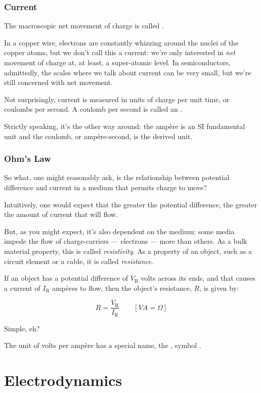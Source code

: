 \subsubsection{Current}

The macroscopic net movement of charge is called .

In a copper wire, electrons are constantly whizzing around the nuclei
of the copper atoms, but we don't call this a current: we're only
interested in \emph{net} movement of charge at, at least, a
super-atomic level. In semiconductors, admittedly, the scales where we
talk about current can be very small, but we're still concerned with
net movement.

Not surprisingly, current is measured in units of charge per unit
time, or coulombs per second. A coulomb per second is called an
.

Strictly speaking, it's the other way around: the amp\`ere is an SI
fundamental unit and the coulomb, or amp\`ere-second, is the derived
unit.

\subsubsection{Ohm's Law}

So what, one might reasonably ask, is the relationship between
potential difference and current in a medium that permits charge to
move?

Intuitively, one would expect that the greater the potential
difference, the greater the amount of current that will flow.

But, as you might expect, it's also dependent on the medium: some
media impede the flow of charge-carriers --- electrons --- more than
others. As a bulk material property, this is called
\emph{resistivity}. As a property of an object, such as a circuit
element or a cable, it is called \emph{resistance}.

If an object has a potential difference of $V_\mathrm{R}$ volts across
its ends, and that causes a current of $I_\mathrm{R}$ amp\`eres to
flow, then the object's resistance, $R$, is given by:

\begin{equation}
R = \frac{V_\mathrm{R}}{I_\mathrm{R}} \qquad\left[\unit{V}{A}=\unit{\Omega}\right]
\end{equation}

Simple, eh?

The unit of volts per amp\`ere has a special name, the ,
symbol \unit{\Omega}.


\section{Electrodynamics}







